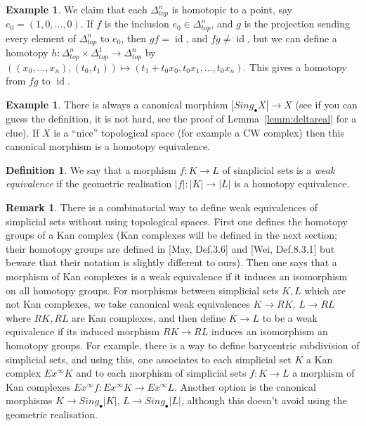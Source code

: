 \documentclass[a4paper]{amsart}
\numberwithin{figure}{section}
\theoremstyle{theorem}
\theoremstyle{definition}
\newtheorem{defi}[thm]{Definition}
\newtheorem{rema}[thm]{Remark}
\newtheorem{exam}[thm]{Example}
\newcommand{\RR}{\mathbb{R}}
\DeclareMathOperator{\id}{id}
\begin{document}
\begin{exam}
We claim that each $\Delta^n_{top}$ is homotopic to a point, say $e_0 = (1, 0, \dots, 0)$. If $f$ is the inclusion $e_0 \in \Delta^n_{top}$, and $g$ is the projection sending every element of $\Delta^n_{top}$ to $e_0$, then $g f = \id$, and $fg \neq \id$, but we can define a homotopy $h: \Delta^n_{top} \times \Delta^
1_{top} \to \Delta^n_{top}$ by $((x_0, \dots, x_n), (t_0, t_1)) \mapsto (t_1  + t_0 x_0, t_0 x_1, \dots,  t_0 x_n)$. This gives a homotopy from $fg$ to $\id$. 
\end{exam}

\begin{exam}
There is always a canonical morphism $|Sing_\bullet X| \to X$ (see if you can guess the definition, it is not hard, see the proof of Lemma~\ref{lemm:deltareal} for a clue). If $X$ is a ``nice'' topological space (for example a CW complex) then this canonical morphism is a homotopy equivalence.
\end{exam}


\begin{mdframed}
\begin{defi}
We say that a morphism $f: K \to L$ of simplicial sets is a \emph{weak equivalence} if the geometric realisation $|f|: |K| \to |L|$ is a homotopy equivalence. 
\end{defi}
\end{mdframed}

\begin{rema}
There is a combinatorial way to define weak equivalences of simplicial sets without using topological spaces. First one defines the homotopy groups of a Kan complex (Kan complexes will be defined in the next section; their homotopy groups are defined in [May, Def.3.6] and [Wei, Def.8.3.1] but beware that their notation is slightly different to ours). Then one says that a morphism of Kan complexes is a weak equivalence if it induces an isomorphism on all homotopy groups. For morphisms between simplicial sets $K, L$ which are not Kan complexes, we take canonical weak equivalences $K \to RK$, $L \to RL$ where $RK, RL$ are Kan complexes, and then define $K \to L$ to be a weak equivalence if its induced morphism $RK \to RL$ induces an isomorphism an homotopy groups. For example, there is a way to define barycentric subdivision of simplicial sets, and using this, one associates to each simplicial set $K$ a Kan complex $Ex^∞K$ and to each morphism of simplicial sets $f: K \to L$ a morphism of Kan complexes $Ex^∞f: Ex^∞K \to Ex^∞L$. Another option is the canonical morphisms $K \to Sing_\bullet |K|$, $L \to Sing_\bullet |L|$, although this doesn't avoid using the geometric realisation.
\end{rema}
\end{document}
